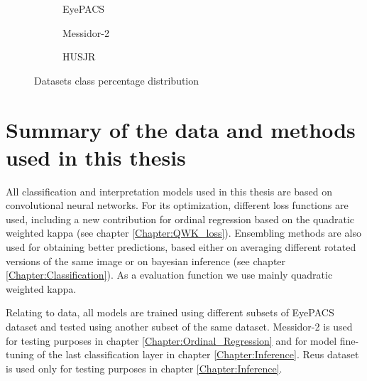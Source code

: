 \begin{figure}[h]
	\centering
	\begin{subfigure}[b]{0.3\textwidth}
		\centering
		\caption{EyePACS}\label{back:fig:eyepacs_pie}
	\end{subfigure}
	\begin{subfigure}[b]{0.3\textwidth}
	\centering
	\caption{Messidor-2}\label{back:fig:messidor2_pie}
	\end{subfigure}
	\begin{subfigure}[b]{0.3\textwidth}
	\centering
	\caption{HUSJR}\label{back:fig:reus_pie}
	\end{subfigure}
	\caption{Datasets class percentage distribution}  
	\label{back:fig:datasets_class_percentage} 
\end{figure}

\section{Summary of the data and methods used in this thesis}

All classification and interpretation models used in this thesis are based on convolutional neural networks. For its optimization, different loss functions are used, including a new contribution for ordinal regression based on the quadratic weighted kappa (see chapter \ref{Chapter:QWK_loss}). Ensembling methods are also used for obtaining better predictions, based either on averaging different rotated versions of the same image or on bayesian inference (see chapter \ref{Chapter:Classification}). As a evaluation function we use mainly quadratic weighted kappa. 

Relating to data, all models are trained using different subsets of EyePACS dataset and tested using another subset of the same dataset. Messidor-2 is used for testing purposes in chapter \ref{Chapter:Ordinal_Regression} and for model fine-tuning of the last classification layer in chapter \ref{Chapter:Inference}. Reus dataset is used only for testing purposes in chapter \ref{Chapter:Inference}.
